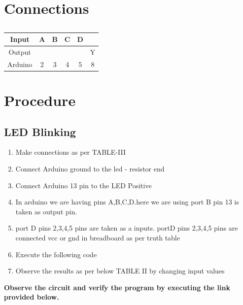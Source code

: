 \documentclass[journal,12pt,twocolumn]{IEEEtran}
\begin{document}
\pagebreak
\section{\textbf{Connections}}
\begin{table}[!h]
\begin{tabular}{|c|c|c|c|c|c|}
\hline
\centering
Input & A & B & C & D & \\ 
\hline 
Output &  &  &  &  & Y\\
\hline
Arduino & 2 & 3 & 4 & 5 & 8\\


\hline
\end{tabular}
\centering 
\label{}
\caption{}

\end{table}

\section{Procedure}

\subsection{LED Blinking}
\begin{enumerate}
\item Make connections as per TABLE-III
\item Connect Arduino ground to the led - resistor end
\item Connect Arduino 13 pin to the LED Positive
\item In arduino we are having pins A,B,C,D.here we are using port B pin 13 is taken as output pin.
\item port D pins 2,3,4,5 pins are taken as a inputs. portD pins 2,3,4,5 pins are connected vcc or gnd in breadboard as per truth table
\item Execute the following code
\item Observe the results as per below TABLE II by changing input values
\end{enumerate}


\textbf{Observe the circuit and verify the program by executing the link provided below.}\\
\begin{center}
\end{center}
\end{document}
